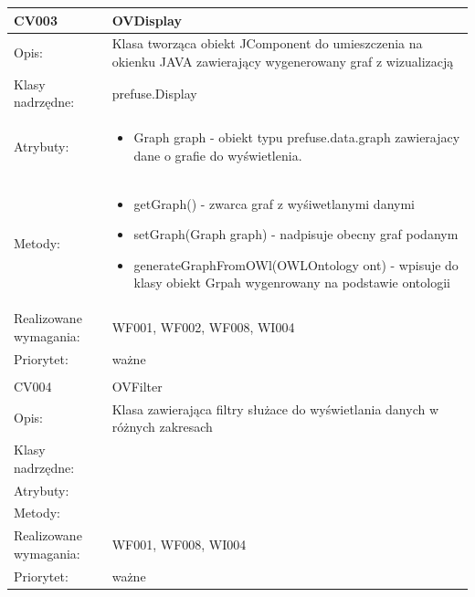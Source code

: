 \documentclass[a4paper,10pt]{article}
\begin{document}
\begin{center}
\begin{longtable}{|m{3cm}|m{9cm}|}
CV003 & OVDisplay \\ \hline
Opis: &  Klasa tworząca obiekt JComponent do umieszczenia na okienku JAVA zawierający wygenerowany graf z wizualizacją   \\ \hline
Klasy nadrzędne: &  prefuse.Display   \\ \hline
Atrybuty: & \begin{itemize}
 \item Graph graph - obiekt typu prefuse.data.graph zawierajacy dane o grafie do wyświetlenia. 
\end{itemize}
 \\ \hline
Metody: & \begin{itemize}
 \item getGraph() - zwarca graf z wyśiwetlanymi danymi
 \item setGraph(Graph graph) - nadpisuje obecny graf podanym
 \item generateGraphFromOWl(OWLOntology ont) - wpisuje do klasy obiekt Grpah wygenrowany na podstawie ontologii
	 
\end{itemize}
  \\ \hline
Realizowane wymagania: & WF001, WF002, WF008, WI004 \\ \hline
Priorytet: & ważne  \\ \hline

\multicolumn{2}{c}{} \\
 \hline

CV004 & OVFilter \\ \hline
Opis: & Klasa zawierająca filtry służace do wyświetlania danych w różnych zakresach    \\ \hline
Klasy nadrzędne: &     \\ \hline
Atrybuty: & %
 \\ \hline
Metody: & %
  \\ \hline
Realizowane wymagania: & WF001, WF008, WI004 \\ \hline
Priorytet: & ważne  \\ \hline



\end{longtable}

\end{center}
\end{document}
